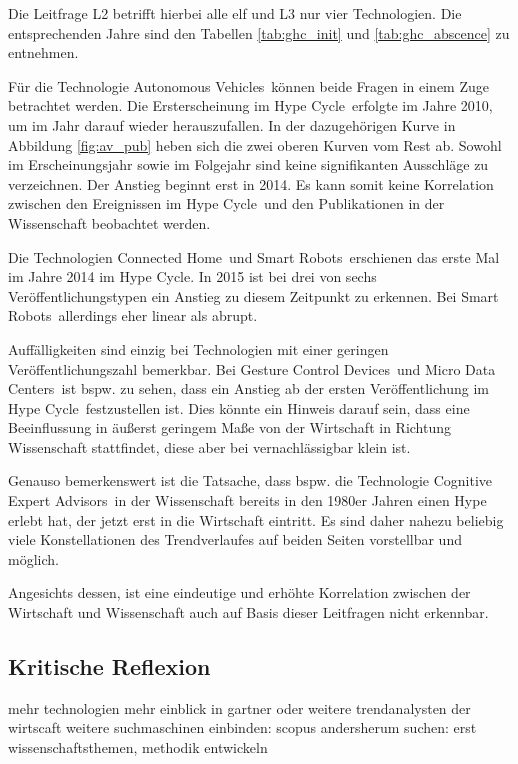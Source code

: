 Die Leitfrage L2 betrifft hierbei alle elf und L3 nur vier Technologien. Die entsprechenden Jahre sind den Tabellen \ref{tab:ghc_init} und \ref{tab:ghc_abscence} zu entnehmen.

Für die Technologie \glqq Autonomous Vehicles\grqq~können beide Fragen in einem Zuge betrachtet werden. Die Ersterscheinung im \glqq Hype Cycle\grqq~erfolgte im Jahre 2010, um im Jahr darauf wieder herauszufallen. In der dazugehörigen Kurve in Abbildung \ref{fig:av_pub} heben sich die zwei oberen Kurven vom Rest ab. Sowohl im Erscheinungsjahr sowie im Folgejahr sind keine signifikanten Ausschläge zu verzeichnen. Der Anstieg beginnt erst in 2014. Es kann somit keine Korrelation zwischen den Ereignissen im \glqq Hype Cycle\grqq~und den Publikationen in der Wissenschaft beobachtet werden.

Die Technologien \glqq Connected Home\grqq~und \glqq Smart Robots\grqq~erschienen das erste Mal im Jahre 2014 im \glqq Hype Cycle\grqq. In 2015 ist bei drei von sechs Veröffentlichungstypen ein Anstieg zu diesem Zeitpunkt zu erkennen. Bei \glqq Smart Robots\grqq~allerdings eher linear als abrupt.

Auffälligkeiten sind einzig bei Technologien mit einer geringen Veröffentlichungszahl bemerkbar. Bei \glqq Gesture Control Devices\grqq~und \glqq Micro Data Centers\grqq~ist bspw. zu sehen, dass ein Anstieg ab der ersten Veröffentlichung im \glqq Hype Cycle\grqq~festzustellen ist. Dies könnte ein Hinweis darauf sein, dass eine Beeinflussung in äußerst geringem Maße von der Wirtschaft in Richtung Wissenschaft stattfindet, diese aber bei vernachlässigbar klein ist.

Genauso bemerkenswert ist die Tatsache, dass bspw. die Technologie \glqq Cognitive Expert Advisors\grqq~in der Wissenschaft bereits in den 1980er Jahren einen Hype erlebt hat, der jetzt erst in die Wirtschaft eintritt. Es sind daher nahezu beliebig viele Konstellationen des Trendverlaufes auf beiden Seiten vorstellbar und möglich.

Angesichts dessen, ist eine eindeutige und erhöhte Korrelation zwischen der Wirtschaft und Wissenschaft auch auf Basis dieser Leitfragen nicht erkennbar.

\subsection{Kritische Reflexion}

mehr technologien
mehr einblick in gartner oder weitere trendanalysten der wirtscaft
weitere suchmaschinen einbinden: scopus
andersherum suchen: erst wissenschaftsthemen, methodik entwickeln